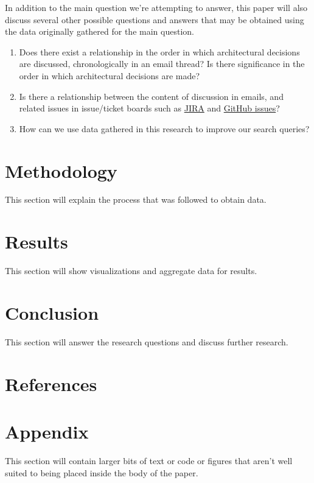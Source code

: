 \documentclass[a4paper, 12pt]{article}
\begin{document}
	In addition to the main question we're attempting to answer, this paper will also discuss several other possible questions and answers that may be obtained using the data originally gathered for the main question.
	
	\begin{enumerate}
		\item Does there exist a relationship in the order in which architectural decisions are discussed, chronologically in an email thread? Is there significance in the order in which architectural decisions are made?
		
		\item Is there a relationship between the content of discussion in emails, and related issues in issue/ticket boards such as \href{https://www.atlassian.com/software/jira}{JIRA} and \href{https://github.com/features/issues}{GitHub issues}?
		
		\item How can we use data gathered in this research to improve our search queries?
	\end{enumerate}

\section{Methodology}
	This section will explain the process that was followed to obtain data.

\section{Results}
	This section will show visualizations and aggregate data for results.

\section{Conclusion}
	This section will answer the research questions and discuss further research.

\section{References}
\printbibliography[heading=none]

\section{Appendix}
	This section will contain larger bits of text or code or figures that aren't well suited to being placed inside the body of the paper.
\end{document}
